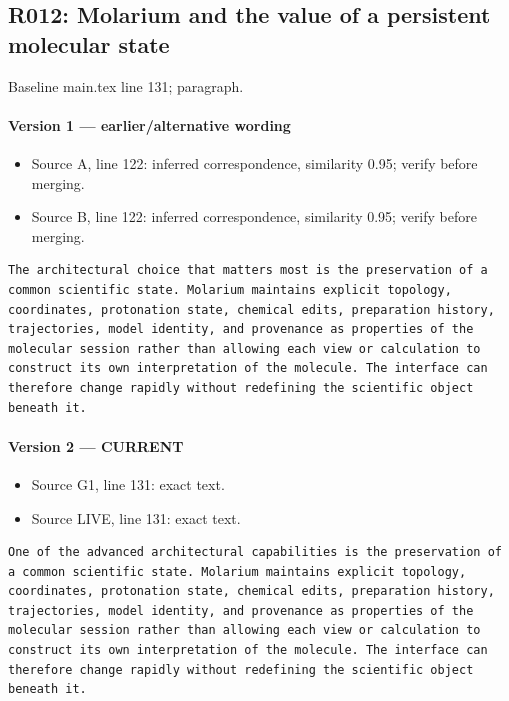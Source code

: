 \documentclass[11pt]{article}
\begin{document}
\subsection{R012: Molarium and the value of a persistent molecular state}

Baseline main.tex line 131; paragraph.

\paragraph{Version 1 --- earlier/alternative wording}

\begin{itemize}[leftmargin=*]
\item Source A, line 122: inferred correspondence, similarity 0.95; verify before merging.
\item Source B, line 122: inferred correspondence, similarity 0.95; verify before merging.
\end{itemize}

\begin{lstlisting}
The architectural choice that matters most is the preservation of a common scientific state. Molarium maintains explicit topology, coordinates, protonation state, chemical edits, preparation history, trajectories, model identity, and provenance as properties of the molecular session rather than allowing each view or calculation to construct its own interpretation of the molecule. The interface can therefore change rapidly without redefining the scientific object beneath it.
\end{lstlisting}

\paragraph{Version 2 --- CURRENT}

\begin{itemize}[leftmargin=*]
\item Source G1, line 131: exact text.
\item Source LIVE, line 131: exact text.
\end{itemize}

\begin{lstlisting}
One of the advanced architectural capabilities is the preservation of a common scientific state. Molarium maintains explicit topology, coordinates, protonation state, chemical edits, preparation history, trajectories, model identity, and provenance as properties of the molecular session rather than allowing each view or calculation to construct its own interpretation of the molecule. The interface can therefore change rapidly without redefining the scientific object beneath it.
\end{lstlisting}
\end{document}
